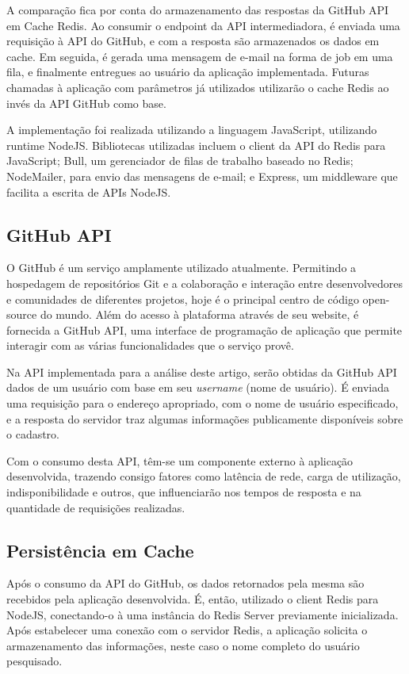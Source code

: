 \documentclass[12pt]{article}
\begin{document}
A comparação fica por conta do armazenamento das respostas da GitHub API em Cache Redis. Ao consumir o endpoint da API intermediadora, é enviada uma requisição à API do GitHub, e com a resposta são armazenados os dados em cache. Em seguida, é gerada uma mensagem de e-mail na forma de job em uma fila, e finalmente entregues ao usuário da aplicação implementada. Futuras chamadas à aplicação com parâmetros já utilizados utilizarão o cache Redis ao invés da API GitHub como base.

A implementação foi realizada utilizando a linguagem JavaScript, utilizando runtime NodeJS. Bibliotecas utilizadas incluem o client da API do Redis para JavaScript; Bull, um gerenciador de filas de trabalho baseado no Redis; NodeMailer, para envio das mensagens de e-mail; e Express, um middleware que facilita a escrita de APIs NodeJS.

\subsection{GitHub API}

O GitHub é um serviço amplamente utilizado atualmente. Permitindo a hospedagem de repositórios Git e a colaboração e interação entre desenvolvedores e comunidades de diferentes projetos, hoje é o principal centro de código open-source do mundo. Além do acesso à plataforma através de seu website, é fornecida a GitHub API, uma interface de programação de aplicação que permite interagir com as várias funcionalidades que o serviço provê.

Na API implementada para a análise deste artigo, serão obtidas da GitHub API dados de um usuário com base em seu \textit{username} (nome de usuário). É enviada uma requisição para o endereço apropriado, com o nome de usuário especificado, e a resposta do servidor traz algumas informações publicamente disponíveis sobre o cadastro.

Com o consumo desta API, têm-se um componente externo à aplicação desenvolvida, trazendo consigo fatores como latência de rede, carga de utilização, indisponibilidade e outros, que influenciarão nos tempos de resposta e na quantidade de requisições realizadas.

\subsection{Persistência em Cache}

Após o consumo da API do GitHub, os dados retornados pela mesma são recebidos pela aplicação desenvolvida. É, então, utilizado o client Redis para NodeJS, conectando-o à uma instância do Redis Server previamente inicializada. Após estabelecer uma conexão com o servidor Redis, a aplicação solicita o armazenamento das informações, neste caso o nome completo do usuário pesquisado.
\end{document}
